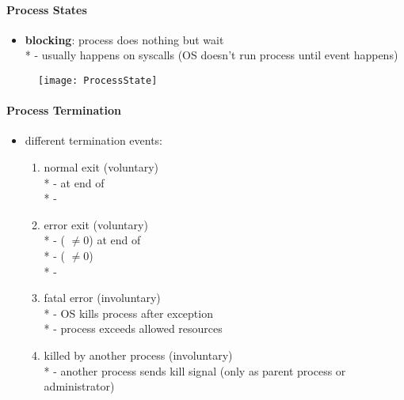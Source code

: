 \paragraph{Process States}
\begin{itemize}
  \item \textbf{blocking}: process does nothing but wait \\*
    - usually happens on syscalls (OS doesn't run process until event happens)
\end{itemize}

\begin{figure}[h]\centering\label{ProcessState}\texttt{[image: ProcessState]}\end{figure}

\paragraph{Process Termination}
\begin{itemize}
  \item different termination events: 
  \begin{enumerate}
    \item normal exit (voluntary) \\*
      -  at end of  \\*
      - 
    \item error exit (voluntary) \\*
      -  ( \( \neq 0 \)) at end of  \\*
      -  ( \( \neq 0 \)) \\*
      - 
    \item fatal error (involuntary) \\*
      - OS kills process after exception \\*
      - process exceeds allowed resources
    \item killed by another process (involuntary) \\*
      - another process sends kill signal (only as parent process or administrator)
  \end{enumerate}
\end{itemize}

